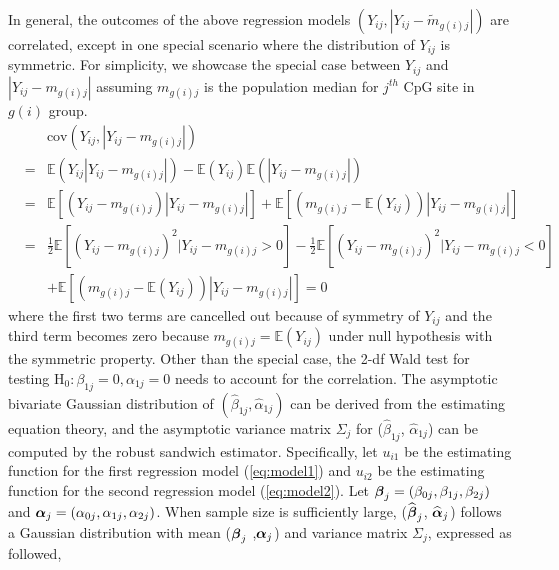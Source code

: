 \documentclass{statsoc}
\begin{document}
In general, the outcomes of the above regression models $(Y_{ij},|Y_{ij} - \widetilde{m}_{g(i)j}|)$ are correlated, except in one special scenario where the distribution of $Y_{ij}$ is symmetric. For simplicity, we showcase the special case between $Y_{ij}$ and $|Y_{ij} - m_{g(i)j}|$ assuming $m_{g(i)j}$ is the population median for $j^{th}$ CpG site in $g(i)$ group.
\begin{eqnarray}
 & & \text{cov}\left(Y_{ij},|Y_{ij} - m_{g(i)j}|\right) \nonumber \\
 &=& \mathbb{E}\left(Y_{ij}|Y_{ij} - m_{g(i)j}|\right) - \mathbb{E}\left(Y_{ij}\right)\mathbb{E}\left(|Y_{ij} - m_{g(i)j}|\right) \nonumber \\
 &=&\mathbb{E}\left[(Y_{ij} - m_{g(i)j})|Y_{ij} - m_{g(i)j}|\right]
    + \mathbb{E}\left[(m_{g(i)j} - \mathbb{E}(Y_{ij}))|Y_{ij} - m_{g(i)j}|\right] \nonumber \\
&=&\frac{1}{2}\mathbb{E}\left[(Y_{ij} - m_{g(i)j})^2|Y_{ij} - m_{g(i)j}>0\right] - \frac{1}{2}\mathbb{E}\left[(Y_{ij} - m_{g(i)j})^2|Y_{ij} - m_{g(i)j}<0\right] \nonumber \\
& & + \mathbb{E}\left[(m_{g(i)j} - \mathbb{E}(Y_{ij}))|Y_{ij} - m_{g(i)j}|\right] = 0 \nonumber
\end{eqnarray}
where the first two terms are cancelled out because of symmetry of $Y_{ij}$ and the third term becomes zero because $m_{g(i)j} = \mathbb{E}(Y_{ij})$ under null hypothesis with the symmetric property. Other than the special case, the 2-df Wald test for testing $\mbox{H}_{0}: \beta_{1j}=0, \alpha_{1j}=0$ needs to account for the correlation. The asymptotic bivariate Gaussian distribution of $(\hat{\beta}_{1j}, \hat{\alpha}_{1j})$ can be derived from the estimating equation theory, and the asymptotic variance matrix $\Sigma_j$ for ($\hat{\beta}_{1j}$, $\hat{\alpha}_{1j}$) can be computed by the robust sandwich estimator. Specifically, let $u_{i1}$ be the estimating function for the first regression model (\ref{eq:model1}) and $u_{i2}$ be the estimating function for the second regression model (\ref{eq:model2}). Let $\mbox{\boldmath $ \beta $}_{j} =(\beta_{0j},\beta_{1j},\beta_{2j}) $ and $\mbox{\boldmath $ \alpha $}_{j} =(\alpha_{0j},\alpha_{1j},\alpha_{2j})$. When sample size is sufficiently large,  ($\widehat{\mbox{\boldmath $ \beta $}}_{j}$, $\widehat{\mbox{\boldmath $ \alpha $}}_{j}$) follows a Gaussian distribution with mean ($\mbox{\boldmath $ \beta $}_{j}$  ,$\mbox{\boldmath $ \alpha $}_{j}$) and variance matrix $\Sigma_j$, expressed as followed,
\end{document}
